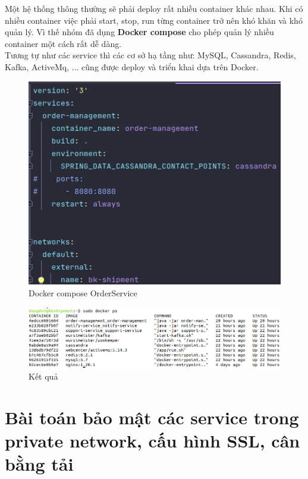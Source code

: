 		  
		  Một hệ thống thông thường sẽ phải deploy rất nhiều container khác nhau. Khi có nhiều container việc phải start, stop, run từng container trở nên khó khăn và khó quản lý. Vì thế nhóm đã dụng \textbf{Docker compose} cho phép quản lý nhiều container một cách rất dễ dàng.\\
		  
		  Tương tự như các service thì các cơ sở hạ tầng như: MySQL, Cassandra, Redis, Kafka, ActiveMq, ... cũng được deploy và triển khai dựa trên Docker.
		  
		  \begin{figure}
		  	\centering
		  	\includegraphics[width=0.8\linewidth]{Images/DockercomposeOrderService}
		  	\linebreak
		  	\caption{Docker compose OrderService}
		  \end{figure}
		  
		  \begin{figure}
		  	\centering
		  	\includegraphics[width=0.8\linewidth]{Images/DockerResult}
		  	\linebreak
		  	\caption{Kết quả}
		  \end{figure}
	  
	  \newpage
	  
	  \section{Bài toán bảo mật các service trong private network, cấu hình SSL, cân bằng tải}
	  
